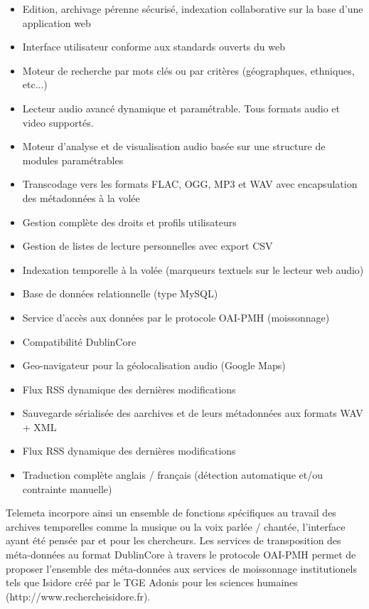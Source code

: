 \documentclass[a4paper,11pt,french]{article}
\begin{document}
\begin{itemize}
\item Edition, archivage pérenne sécurisé, indexation collaborative sur la base d'une application web
\item Interface utilisateur conforme aux standards ouverts du web 
\item Moteur de recherche par mots clés ou par critères (géographques, ethniques, etc...) 
\item Lecteur audio avancé dynamique et paramétrable. Tous formats audio et video supportés. 
\item Moteur d'analyse et de visualisation audio basée sur une structure de modules paramétrables 
\item Transcodage vers les formats FLAC, OGG, MP3 et WAV avec encapsulation des métadonnées à la volée 
\item Gestion complète des droits et profils utilisateurs 
\item Gestion de listes de lecture personnelles avec export CSV 
\item Indexation temporelle à la volée (marqueurs textuels sur le lecteur web audio) 
\item Base de données relationnelle (type MySQL) 
\item Service d'accès aux données par le protocole OAI-PMH (moissonnage) 
\item Compatibilité DublinCore 
\item Geo-navigateur pour la géolocalisation audio (Google Maps) 
\item Flux RSS dynamique des dernières modifications 
\item Sauvegarde sérialisée des aarchives et de leurs métadonnées aux formats WAV + XML 
\item Flux RSS dynamique des dernières modifications 
\item Traduction complète anglais / français (détection automatique et/ou contrainte manuelle) 
\end{itemize}

Telemeta incorpore ainsi un ensemble de fonctions spécifiques au travail des archives temporelles comme la musique ou la voix parlée / chantée, l'interface ayant été pensée par et pour les chercheurs. Les services de transposition des méta-données au format DublinCore à travers le protocole OAI-PMH permet de proposer l'ensemble des méta-données aux services de moissonnage institutionels tels que Isidore créé par le TGE Adonis pour les sciences humaines (http://www.rechercheisidore.fr). 
\end{document}
